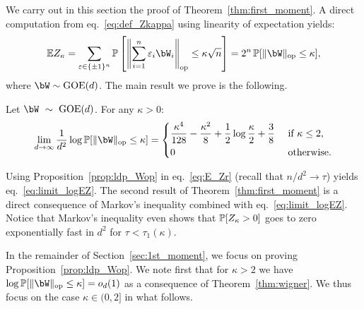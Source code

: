 We carry out in this section the proof of Theorem~\ref{thm:first_moment}.
A direct computation from eq.~\eqref{eq:def_Zkappa} using linearity of expectation yields:
\begin{equation}
    \label{eq:E_Zr}
    \EE Z_\kappa = \sum_{\eps \in \{\pm 1\}^n} \bbP\left[\left\|\sum_{i=1}^n \eps_i \bW_i\right\|_{\op} \leq \kappa \sqrt{n}\right] = 2^n \, \bbP[\|\bW\|_\op \leq \kappa],
\end{equation}
where $\bW \sim \GOE(d)$.
The main result we prove is the following.
\begin{proposition}
    \label{prop:ldp_Wop}
    Let $\bW~\sim~\GOE(d)$. For any $\kappa > 0$:
    \begin{equation}
        \label{eq:ldp_Wop}
        \lim_{d \to \infty} \frac{1}{d^2} \log \bbP[\|\bW\|_\op \leq \kappa]
        = 
        \begin{dcases}
            \frac{\kappa^4}{128} - \frac{\kappa^2}{8} + \frac{1}{2} \log \frac{\kappa}{2} + \frac{3}{8} &\textrm{ if } \kappa \leq 2, \\
            0 &\textrm{ otherwise.} 
        \end{dcases}
    \end{equation}
\end{proposition}
\noindent
Using Proposition~\ref{prop:ldp_Wop} in eq.~\eqref{eq:E_Zr} (recall that $n/d^2 \to \tau$) yields eq.~\eqref{eq:limit_logEZ}.
The second result of Theorem~\ref{thm:first_moment} is a direct consequence of Markov's inequality combined with eq.~\eqref{eq:limit_logEZ}.
Notice that Markov's inequality even shows that $\mathbb{P}[Z_\kappa > 0]$ goes to zero exponentially fast in $d^2$ for $\tau < \tau_1(\kappa)$.

\myskip 
In the remainder of Section~\ref{sec:1st_moment}, we focus on proving Proposition~\ref{prop:ldp_Wop}.
We note first that for $\kappa > 2$ we have $\log \bbP[\|\bW\|_\op \leq \kappa] = \smallO_d(1)$ as a consequence of Theorem~\ref{thm:wigner}. 
We thus focus on the case $\kappa \in (0,2]$ in what follows.

